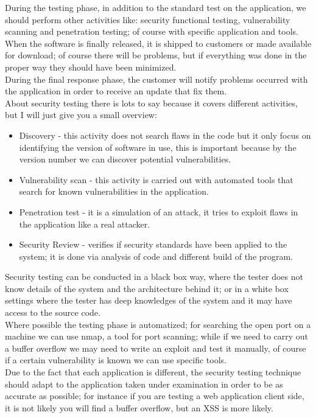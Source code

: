 During the testing phase, in addition to the standard test on the application, we should perform other activities like:
security functional testing, vulnerability scanning and penetration testing; of course with specific application and tools.\\ 

When the software is finally released, it is shipped to customers or made available for download; of course there will be
problems, but if everything was done in the proper way they should have been minimized.\\
During the final response phase, the customer will notify problems occurred with the application in order to receive
an update that fix them.\\

About security testing there is lots to say because it covers different activities, but I will just give you a small overview:
\begin{itemize}
	\item Discovery - this activity does not search flaws in the code but it only focus on identifying the version of software in use, this is important because by the version number we can discover potential vulnerabilities.
	\item Vulnerability scan - this activity is carried out with automated tools that search for
	known vulnerabilities in the application.
	\item Penetration test - it is a simulation of an attack, it tries to exploit flaws in the application like a real attacker.
	\item Security Review - verifies if security standards have been applied to the system; it is
	done via analysis of code and different build of the program.
\end{itemize}


Security testing can be conducted in a black box way, where the tester does not know details of the system and the architecture behind it; or
in a white box settings where the tester has deep knowledges of the system and it may have access to the source code.\\
Where possible the testing phase is automatized; for searching the open port on a machine we can use nmap, a tool for port scanning; while if we
need to carry out a buffer overflow we may need to write an exploit and test it manually, of course if a certain vulnerability is known 
we can use specific tools.\\
Due to the fact that each application is different, the security testing technique should adapt to the application taken under examination in order
to be as accurate as possible; for instance if you are testing a web application client side, it is not likely you will find a buffer overflow, but 
an XSS is more likely.\\

